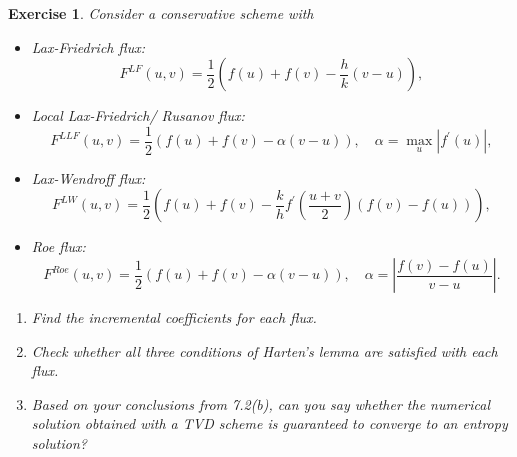 \documentclass[10pt,letterpaper]{article}
\theoremstyle{break}
\newtheorem{exercise}{Exercise}
\begin{document}
\begin{exercise}
        Consider a conservative scheme with
        \begin{itemize}
        \item Lax-Friedrich flux:
        \[
        F^{LF}(u,v)= \frac{1}{2} \left( f(u) + f(v) - \frac{h}{k} (v-u)\right),
        \]
        \item Local Lax-Friedrich/ Rusanov flux:
        \[
        F^{LLF}(u,v)= \frac{1}{2} \left( f(u) + f(v) - \alpha (v-u)\right), \quad \alpha = \max_u|f^\prime(u)|,
        \]
        \item Lax-Wendroff flux:
        \[
        F^{LW}(u,v)= \frac{1}{2} \left( f(u) + f(v) - \frac{k}{h} f^\prime\left( \frac{u+v}{2}\right)(f(v) - f(u))\right),
        \]
        \item Roe flux:
        \[
        F^{Roe}(u,v)= \frac{1}{2} \left( f(u) + f(v) - \alpha (v-u)\right), \quad \alpha = \left|\frac{f(v) -f(u)}{v-u}\right|.
        \]
        \end{itemize}
        \begin{enumerate}
        \item Find the incremental coefficients for each flux. 
        \item Check whether all three conditions of Harten's lemma are satisfied with each flux.
        \item Based on your conclusions from 7.2(b), can you say whether the numerical solution obtained with a TVD scheme is guaranteed to converge to an entropy solution?
        \end{enumerate}
\end{exercise}
\end{document}

